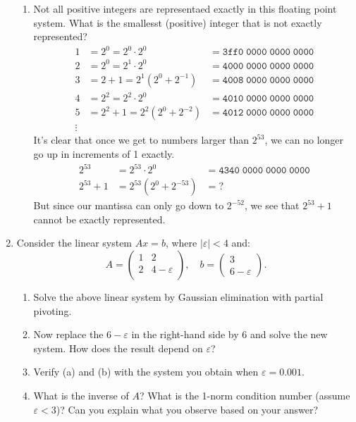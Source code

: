 \documentclass[11pt]{article}
\begin{document}
\begin{enumerate}
\begin{enumerate}
		      \item Not all positive integers are representaed exactly in this floating point system.  What is the smallesst (positive) integer that is not exactly represented?
		            \begin{align*}
			            1 & = 2^0 = 2^0 \cdot 2^0           & = \mathtt{3ff0\;0000\;0000\;0000} \\
			            2 & = 2^0 = 2^1 \cdot 2^0           & = \mathtt{4000\;0000\;0000\;0000} \\
			            3 & = 2 + 1 = 2^1 (2^0 + 2^{-1})    & = \mathtt{4008\;0000\;0000\;0000} \\
			            4 & = 2^2 = 2^2 \cdot 2^0           & = \mathtt{4010\;0000\;0000\;0000} \\
			            5 & = 2^2 + 1 =  2^2 (2^0 + 2^{-2}) & = \mathtt{4012\;0000\;0000\;0000} \\
			            \vdots
		            \end{align*}
		            It's clear that once we get to numbers larger than \(2^{53}\), we can no longer go up in increments of 1 exactly.
		            \begin{align*}
			            2^{53}   & = 2^{53} \cdot 2^0       & = \mathtt{4340\;0000\;0000\;0000} \\
			            2^{53}+1 & = 2^{53} (2^0 + 2^{-53}) & = \mathtt{?}
		            \end{align*}
		            But since our mantissa can only go down to \(2^{-52}\), we see that \(2^{53}+1\) cannot be exactly represented.
	      \end{enumerate}

	\item Consider the linear system \(Ax = b\), where \(|\varepsilon| < 4\) and:
	      \[
		      A = \left(\begin{array}{cc} 1 & 2 \\ 2 & 4-\varepsilon \\ \end{array}\right), \quad
		      b = \left(\begin{array}{c} 3 \\ 6-\varepsilon \end{array}\right).
	      \]
	      \begin{enumerate}
		      \item Solve the above linear system by Gaussian elimination with partial pivoting.
		      \item Now replace the \(6-\varepsilon\) in the right-hand side by 6 and solve the new system.  How does the result depend on \(\varepsilon\)?
		      \item Verify (a) and (b) with the system you obtain when \(\varepsilon = 0.001\).
		      \item What is the inverse of \(A\)?  What is the 1-norm condition number (assume \(\varepsilon < 3\))?  Can you explain what you observe based on your answer?
	      \end{enumerate}


\end{enumerate}
\end{document}
